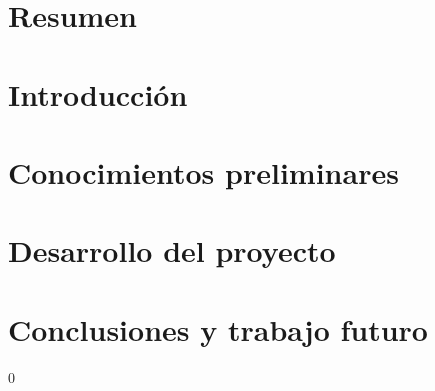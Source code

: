 \documentclass[12pt,titlepage,twoside,openright]{book}
\begin{document}
\frontmatter{}



\pagestyle{plain}
	

\tableofcontents
\newpage 
\listoffigures	




\mainmatter{}
\pagestyle{fancy}
\renewcommand{\chaptermark}[1]{%
\markboth{\chaptername
\ \thechapter.\ #1}{}}
\fancyhead[RO,LE]{\bfseries \thepage}
\fancyfoot{}
\setlength{\parindent}{0pt}
\setlength{\parskip}{1.5ex}



\chapter{Resumen}



\chapter{Introducci\'on}

\chapter{Conocimientos preliminares}

\chapter{Desarrollo del proyecto}

\chapter{Conclusiones y trabajo futuro}



\begin{thebibliography}{0}
		
\end{thebibliography}
\end{document}
